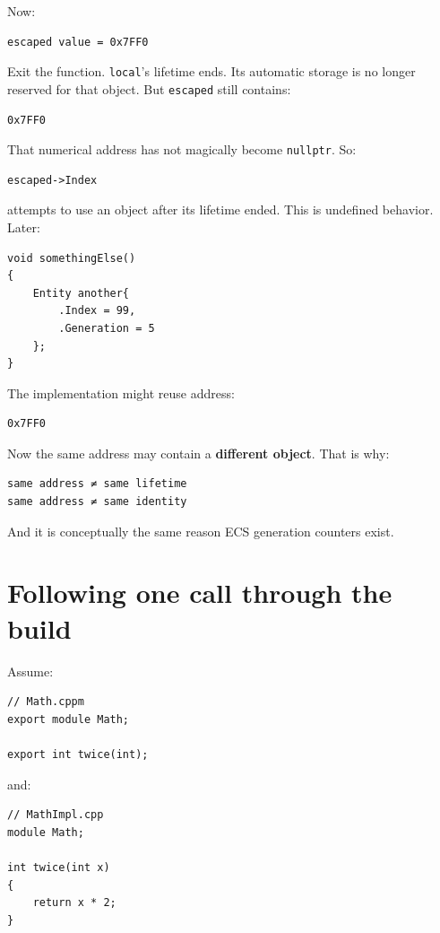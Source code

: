 Now:

\begin{verbatim}
escaped value = 0x7FF0
\end{verbatim}

Exit the function. \texttt{local}'s lifetime ends. Its automatic storage is no longer reserved for that object. But \texttt{escaped} still contains:

\begin{verbatim}
0x7FF0
\end{verbatim}

That numerical address has not magically become \texttt{nullptr}. So:

\begin{verbatim}
escaped->Index
\end{verbatim}

attempts to use an object after its lifetime ended. This is undefined behavior. Later:

\begin{verbatim}
void somethingElse()
{
    Entity another{
        .Index = 99,
        .Generation = 5
    };
}
\end{verbatim}

The implementation might reuse address:

\begin{verbatim}
0x7FF0
\end{verbatim}

Now the same address may contain a \textbf{different object}. That is why:

\begin{verbatim}
same address ≠ same lifetime
same address ≠ same identity
\end{verbatim}

And it is conceptually the same reason ECS generation counters exist.

\section{Following one call through the build}\label{01-foundations-i-ch003-following-one-call-through-the-build}

Assume:

\begin{verbatim}
// Math.cppm
export module Math;

export int twice(int);
\end{verbatim}

and:

\begin{verbatim}
// MathImpl.cpp
module Math;

int twice(int x)
{
    return x * 2;
}
\end{verbatim}


